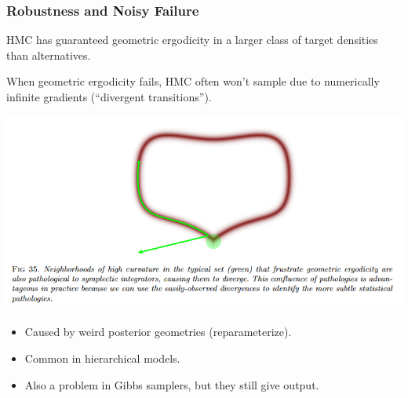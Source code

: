 \documentclass[xcolor=dvipsnames]{beamer}
\begin{document}
\begin{frame}
\frametitle{Robustness and Noisy Failure}
HMC has guaranteed geometric ergodicity in a larger class of target densities than alternatives.

\vspace{0.5cm}

When geometric ergodicity fails, HMC often won't sample due to numerically infinite gradients (``divergent transitions'').
\begin{center}
\includegraphics[height = 0.4\textheight]{divergent.png}
\end{center}
\begin{itemize}
\item Caused by weird posterior geometries (reparameterize).
\item Common in hierarchical models.
\item Also a problem in Gibbs samplers, but they still give output.
\end{itemize}
\end{frame}
\end{document}
